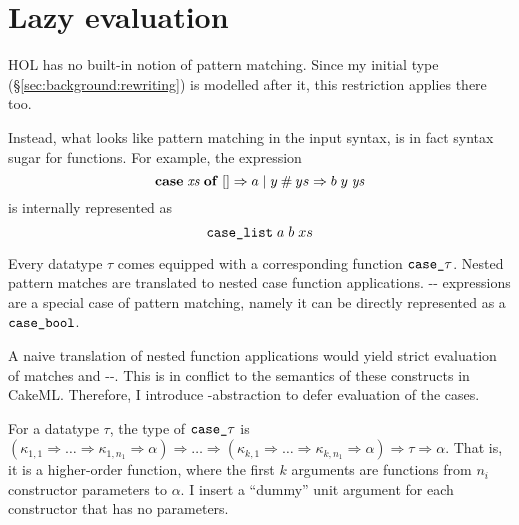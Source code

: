 
\section{Lazy evaluation}
\label{sec:preproc:lazy}


\noindent
HOL has no built-in notion of pattern matching.
Since my initial  type (§\ref{sec:background:rewriting}) is modelled after it, this restriction applies there too.

Instead, what looks like pattern matching in the input syntax, is in fact syntax sugar for  functions.
For example, the expression
%
  \[\mathtt{\mathbf{case}}\;\mathit{xs}\;\mathtt{\mathbf{of}}\;[] \Rightarrow a \mid y\mathbin{\mathtt{\#}} ys \Rightarrow b\;y\;\mathit{ys}\]
is internally represented as
  \[ \texttt{\textup{case\_list}}\;a\;b\;xs \]

Every datatype $\tau$ comes equipped with a corresponding  function $\texttt{\textup{case\_}}\tau$.
Nested pattern matches are translated to nested case function applications.
-- expressions are a special case of pattern matching, namely it can be directly represented as a $\texttt{\textup{case\_bool}}$.

A naive translation of nested function applications would yield strict evaluation of matches and --.
This is in conflict to the semantics of these constructs in CakeML.
Therefore, I introduce -abstraction to defer evaluation of the cases.%

For a datatype $\tau$, the type of $\texttt{\textup{case\_}}\tau$ is $(\kappa_{1,1} \Rightarrow \ldots \Rightarrow \kappa_{1,n_1} \Rightarrow \alpha) \Rightarrow \ldots \Rightarrow (\kappa_{k,1} \Rightarrow \ldots \Rightarrow \kappa_{k,n_1} \Rightarrow \alpha) \Rightarrow \tau \Rightarrow \alpha$.
That is, it is a higher-order function, where the first $k$ arguments are functions from $n_i$ constructor parameters to $\alpha$.
I insert a ``dummy'' unit argument for each constructor that has no parameters.

